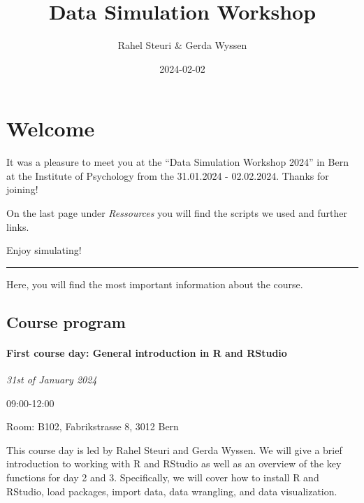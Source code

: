 \documentclass[
  letterpaper,
  DIV=11,
  numbers=noendperiod,
  oneside]{scrreprt}
\title{Data Simulation Workshop}
\author{Rahel Steuri \& Gerda Wyssen}
\date{2024-02-02}
\renewcommand*\contentsname{Table of contents}
\newcommand\contentsname{Table of contents}
\begin{document}
\maketitle
\renewcommand*\contentsname{Table of contents}
{
\hypersetup{linkcolor=}
\setcounter{tocdepth}{2}
\tableofcontents
}

\hypertarget{welcome}{%
\chapter*{Welcome}\label{welcome}}


\hfill\break

It was a pleasure to meet you at the ``Data Simulation Workshop 2024''
in Bern at the Institute of Psychology from the 31.01.2024 - 02.02.2024.
Thanks for joining!

On the last page under \emph{Ressources} you will find the scripts we
used and further links.

Enjoy simulating!

\begin{center}\rule{0.5\linewidth}{0.5pt}\end{center}

Here, you will find the most important information about the course.

\hypertarget{course-program}{%
\section*{Course program}\label{course-program}}


\hypertarget{first-course-day-general-introduction-in-r-and-rstudio}{%
\subsubsection*{First course day: General introduction in R and
RStudio}\label{first-course-day-general-introduction-in-r-and-rstudio}}

\emph{31st of January 2024}

09:00-12:00

Room: B102, Fabrikstrasse 8, 3012 Bern

This course day is led by Rahel Steuri and Gerda Wyssen. We will give a
brief introduction to working with R and RStudio as well as an overview
of the key functions for day 2 and 3. Specifically, we will cover how to
install R and RStudio, load packages, import data, data wrangling, and
data visualization.
\end{document}
